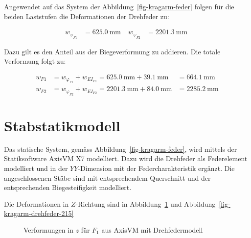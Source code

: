 \documentclass[
  11pt,
  letterpaper,
]{scrreprt}
\begin{document}
Angewendet auf das System der Abbildung~\ref{fig-kragarm-feder} folgen
für die beiden Laststufen die Deformationen der Drehfeder zu:

$$
\begin{aligned}
w_{\varphi_{F1}} &= 625.0\ \mathrm{mm} \; 
 &w_{\varphi_{F2}} &= 2201.3\ \mathrm{mm} \;
\end{aligned}
$$

Dazu gilt es den Anteil aus der Biegeverformung zu addieren. Die totale
Verformung folgt zu:

$$
\begin{aligned}
w_{F1} &= w_{\varphi_{F1}} + w_{EI_{F1}}  = 625.0\ \mathrm{mm} + 39.1\ \mathrm{mm} &= 664.1\ \mathrm{mm}  
\\[12pt]
w_{F2} &= w_{\varphi_{F2}} + w_{EI_{F2}}  = 2201.3\ \mathrm{mm} + 84.0\ \mathrm{mm} &= 2285.2\ \mathrm{mm}  
\end{aligned}
$$

\section{Stabstatikmodell}\label{stabstatikmodell}

Das statische System, gemäss Abbildung~\ref{fig-kragarm-feder}, wird
mittels der Statiksoftware AxisVM X7 modelliert. Dazu wird die Drehfeder
als Federelement modelliert und in der \(YY\)-Dimension mit der
Federcharakteristik ergänzt. Die angeschlossenen Stäbe sind mit
entsprechendem Querschnitt und der entsprechenden Biegesteifigkeit
modelliert.

Die Deformationen in \(Z\)-Richtung sind in
Abbildung~\ref{fig-kragarm-drehfeder-10} und
Abbildung~\ref{fig-kragarm-drehfeder-215}

\begin{figure}[H]


\caption{\label{fig-kragarm-drehfeder-10}Verformungen in \(z\) für
\(F_1\) aus AxisVM mit Drehfedermodell}

\end{figure}%
\end{document}
